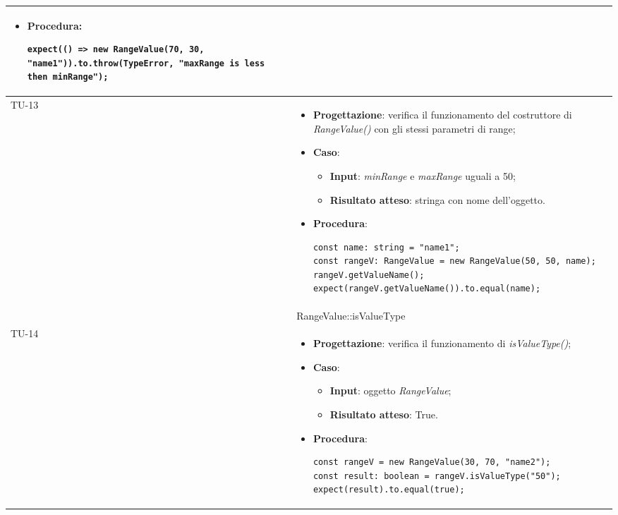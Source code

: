 \begin{longtable}{|C{1.5cm}|C{14.5cm}|}
\begin{itemize}
\begin{itemize}
		\end{itemize}
		\item \textbf{Procedura}:
		\begin{lstlisting}
expect(() => new RangeValue(70, 30, "name1")).to.throw(TypeError, "maxRange is less then minRange");		
		\end{lstlisting}
	\end{itemize}\\
	\hline
	{TU-13} &  
	\begin{itemize}
		\item \textbf{Progettazione}: verifica il funzionamento del costruttore di \emph{RangeValue()} con gli stessi parametri di range;
		\item \textbf{Caso}: 
		\begin{itemize}
			\item \textbf{Input}: \emph{minRange} e \emph{maxRange} uguali a 50;
			\item \textbf{Risultato atteso}: stringa con nome dell'oggetto.
		\end{itemize}
		\item \textbf{Procedura}:
		\begin{lstlisting}
const name: string = "name1";
const rangeV: RangeValue = new RangeValue(50, 50, name);
rangeV.getValueName();
expect(rangeV.getValueName()).to.equal(name);		
		\end{lstlisting}
	\end{itemize}\\
	\hline
	 & RangeValue::isValueType\\
	\hline
	{TU-14} &  
	\begin{itemize}
		\item \textbf{Progettazione}: verifica il funzionamento di \emph{isValueType()};
		\item \textbf{Caso}: 
		\begin{itemize}
			\item \textbf{Input}: oggetto \emph{RangeValue};
			\item \textbf{Risultato atteso}: True.
		\end{itemize}
		\item \textbf{Procedura}:
		\begin{lstlisting}
const rangeV = new RangeValue(30, 70, "name2");
const result: boolean = rangeV.isValueType("50");
expect(result).to.equal(true);		
		\end{lstlisting}
	\end{itemize}\\

\end{longtable}
